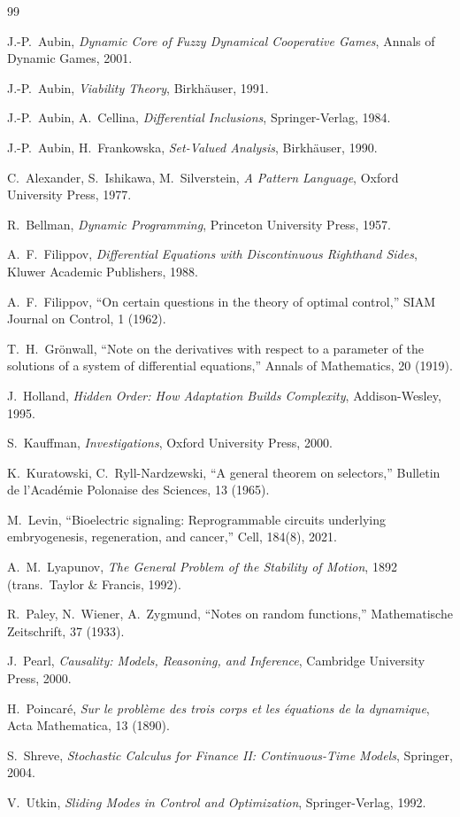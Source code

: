 \documentclass[11pt]{report}
\begin{document}
\begin{thebibliography}{99}

 J.-P.\ Aubin, \emph{Dynamic Core of Fuzzy Dynamical
Cooperative Games}, Annals of Dynamic Games, 2001.

 J.-P.\ Aubin, \emph{Viability Theory}, Birkh\"auser,
1991.

 J.-P.\ Aubin, A.\ Cellina, \emph{Differential
Inclusions}, Springer-Verlag, 1984.

 J.-P.\ Aubin, H.\ Frankowska,
\emph{Set-Valued Analysis}, Birkh\"auser, 1990.

 C.\ Alexander, S.\ Ishikawa, M.\ Silverstein,
\emph{A Pattern Language}, Oxford University Press, 1977.

 R.\ Bellman, \emph{Dynamic Programming}, Princeton
University Press, 1957.

 A.\ F.\ Filippov, \emph{Differential Equations
with Discontinuous Righthand Sides}, Kluwer Academic Publishers, 1988.

 A.\ F.\ Filippov, ``On certain questions in the
theory of optimal control,'' SIAM Journal on Control, 1 (1962).

 T.\ H.\ Gr\"onwall, ``Note on the derivatives
with respect to a parameter of the solutions of a system of
differential equations,'' Annals of Mathematics, 20 (1919).

 J.\ Holland, \emph{Hidden Order: How Adaptation
Builds Complexity}, Addison-Wesley, 1995.

 S.\ Kauffman, \emph{Investigations}, Oxford
University Press, 2000.

 K.\ Kuratowski, C.\ Ryll-Nardzewski, ``A general
theorem on selectors,'' Bulletin de l'Acad\'emie Polonaise des
Sciences, 13 (1965).

 M.\ Levin, ``Bioelectric signaling: Reprogrammable
circuits underlying embryogenesis, regeneration, and cancer,'' Cell,
184(8), 2021.

 A.\ M.\ Lyapunov, \emph{The General Problem of
the Stability of Motion}, 1892 (trans.\ Taylor \& Francis, 1992).

 R.\ Paley, N.\ Wiener, A.\ Zygmund,
``Notes on random functions,'' Mathematische Zeitschrift, 37 (1933).

 J.\ Pearl, \emph{Causality: Models, Reasoning, and
Inference}, Cambridge University Press, 2000.

 H.\ Poincar\'e, \emph{Sur le probl\`eme des trois
corps et les \'equations de la dynamique}, Acta Mathematica, 13 (1890).

 S.\ Shreve, \emph{Stochastic Calculus for Finance
II: Continuous-Time Models}, Springer, 2004.

 V.\ Utkin, \emph{Sliding Modes in Control and
Optimization}, Springer-Verlag, 1992.

\end{thebibliography}
\end{document}
